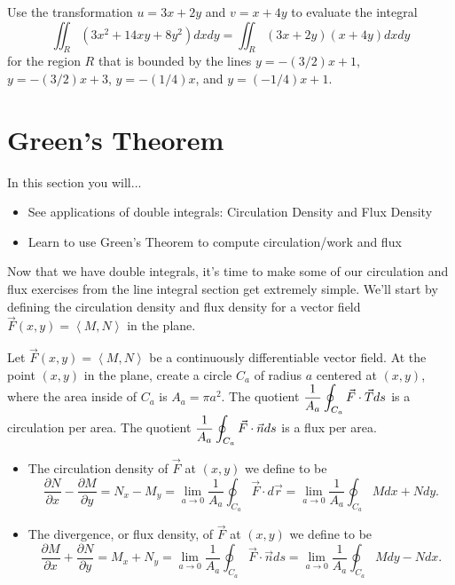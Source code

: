 \begin{problem}
%
 Use the transformation $u=3x+2y$ and $v=x+4y$ to evaluate the integral $$\iint_R (3x^2+14xy+8y^2)dxdy =\iint_R (3x+2y)(x+4y)dxdy $$ for the region $R$ that is bounded by the lines $y=-(3/2)x+1$, $y=-(3/2)x+3$, $y=-(1/4)x$, and  $y=(-1/4)x+1$.
\end{problem}

\section{Green's Theorem}
In this section you will...
\begin{itemize}
\item See applications of double integrals: Circulation Density and Flux Density
\item Learn to use Green's Theorem to compute circulation/work and flux
\end{itemize}

\vskip0.2cm

Now that we have double integrals, it's time to make some of our circulation and flux exercises from the line integral section get extremely simple. We'll start by defining the circulation density and flux density for a vector field $\vec F(x,y)=\left<M,N\right>$ in the plane.

\begin{definition}\label{definition of flux density in 2D}
Let $\vec F(x,y)=\left<M,N\right>$ be a continuously differentiable vector field. 
  At the point $(x,y)$ in the plane, create a circle $C_a$ of radius $a$ centered at $(x,y)$, where the area inside of $C_a$ is $A_a=\pi a^2$. The quotient $\displaystyle \frac{1}{A_a}\oint_{C_a} \vec F \cdot \vec T ds$ is a circulation per area.  The quotient $\displaystyle \frac{1}{A_a}\oint_{C_a} \vec F \cdot \vec n ds$ is a flux per area.
\begin{itemize}
 \item {}%
The circulation density of $\vec F$ at $(x,y)$ we define to be 
$$\frac{\partial N}{\partial x}-\frac{\partial M}{\partial y}=N_x-M_y = \lim_{a\to 0} \frac{1}{A_a}\oint_{C_a} \vec F \cdot  d\vec r = 
\lim_{a\to 0} \frac{1}{A_a}\oint_{C_a} Mdx+Ndy.$$ 
 \item The divergence, or flux density, of $\vec F$ at $(x,y)$ we define to be 
$$\frac{\partial M}{\partial x}+\frac{\partial N}{\partial y}=M_x+N_y=\lim_{a\to 0} \frac{1}{A_a}\oint_{C_a} \vec F \cdot \vec n ds = 
\lim_{a\to 0} \frac{1}{A_a}\oint_{C_a} Mdy-Ndx.$$
\end{itemize}
\end{definition}

